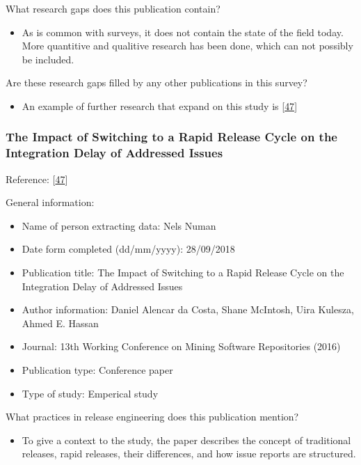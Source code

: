 \documentclass[]{book}
\providecommand{\tightlist}{%
  \setlength{\itemsep}{0pt}\setlength{\parskip}{0pt}}
\begin{document}
What research gaps does this publication contain?

\begin{itemize}
\tightlist
\item
  As is common with surveys, it does not contain the state of the field
  today. More quantitive and qualitive research has been done, which can
  not possibly be included.
\end{itemize}

Are these research gaps filled by any other publications in this survey?

\begin{itemize}
\tightlist
\item
  An example of further research that expand on this study is
  {[}\protect\hyperlink{ref-da2016a}{47}{]}
\end{itemize}

\subsubsection{The Impact of Switching to a Rapid Release Cycle on the
Integration Delay of Addressed
Issues}\label{the-impact-of-switching-to-a-rapid-release-cycle-on-the-integration-delay-of-addressed-issues}

Reference: {[}\protect\hyperlink{ref-da2016a}{47}{]}

General information:

\begin{itemize}
\tightlist
\item
  Name of person extracting data: Nels Numan
\item
  Date form completed (dd/mm/yyyy): 28/09/2018
\item
  Publication title: The Impact of Switching to a Rapid Release Cycle on
  the Integration Delay of Addressed Issues
\item
  Author information: Daniel Alencar da Costa, Shane McIntosh, Uira
  Kulesza, Ahmed E. Hassan
\item
  Journal: 13th Working Conference on Mining Software Repositories
  (2016)
\item
  Publication type: Conference paper
\item
  Type of study: Emperical study
\end{itemize}

What practices in release engineering does this publication mention?

\begin{itemize}
\tightlist
\item
  To give a context to the study, the paper describes the concept of
  traditional releases, rapid releases, their differences, and how issue
  reports are structured.
\end{itemize}
\end{document}
